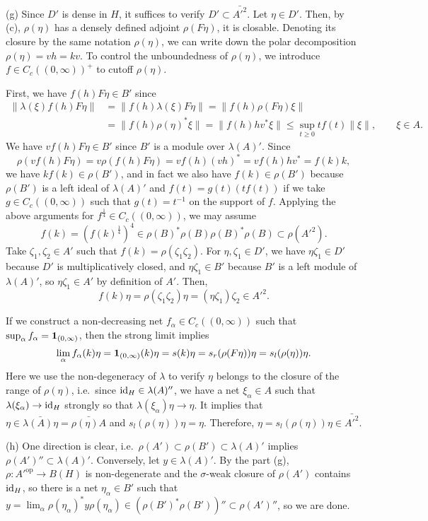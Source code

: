 \documentclass{../../small}
\begin{document}
\begin{pf}
(g)
Since $D'$ is dense in $H$, it suffices to verify $D'\subset\bar{A'^2}$.
Let $\eta\in D'$.
Then, by (c), $\rho(\eta)$ has a densely defined adjoint $\rho(F\eta)$, it is closable.
Denoting its closure by the same notation $\rho(\eta)$, we can write down the polar decomposition $\rho(\eta)=vh=kv$.
To control the unboundedness of $\rho(\eta)$, we introduce $f\in C_c((0,\infty))^+$ to cutoff $\rho(\eta)$.

First, we have $f(h)F\eta\in B'$ since
\begin{align*}
\|\lambda(\xi)f(h)F\eta\|&=\|f(h)\lambda(\xi)F\eta\|=\|f(h)\rho(F\eta)\xi\|\\
&=\|f(h)\rho(\eta)^*\xi\|=\|f(h)hv^*\xi\|\le\sup_{t\ge0}tf(t)\|\xi\|,\qquad\xi\in A.
\end{align*}
We have $vf(h)F\eta\in B'$ since $B'$ is a module over $\lambda(A)'$.
Since
\[\rho(vf(h)F\eta)=v\rho(f(h)F\eta)=vf(h)(vh)^*=vf(h)hv^*=f(k)k,\]
we have $kf(k)\in\rho(B')$, and in fact we also have $f(k)\in\rho(B')$ because $\rho(B')$ is a left ideal of $\lambda(A)'$ and $f(t)=g(t)(tf(t))$ if we take $g\in C_c((0,\infty))$ such that $g(t)=t^{-1}$ on the support of $f$.
Applying the above arguments for $f^{\frac14}\in C_c((0,\infty))$, we may assume
\[f(k)=(f(k)^{\frac14})^4\in\rho(B)^*\rho(B)\rho(B)^*\rho(B)\subset\rho(A'^2).\]
Take $\zeta_1,\zeta_2\in A'$ such that $f(k)=\rho(\zeta_1\zeta_2)$.
For $\eta,\zeta_1\in D'$, we have $\eta\zeta_1\in D'$ because $D'$ is multiplicatively closed, and $\eta\zeta_1\in B'$ because $B'$ is a left module of $\lambda(A)'$, so $\eta\zeta_1\in A'$ by definition of $A'$.
Then,
\[f(k)\eta=\rho(\zeta_1\zeta_2)\eta=(\eta\zeta_1)\zeta_2\in A'^2.\]

If we construct a non-decreasing net $f_\alpha\in C_c((0,\infty))$ such that $\sup_\alpha f_\alpha=\mathbf{1}_{(0,\infty)}$, then the strong limit implies
\[\lim_\alpha f_\alpha(k)\eta=\mathbf{1}_{(0,\infty)}(k)\eta=s(k)\eta=s_r(\rho(F\eta))\eta=s_l(\rho(\eta))\eta.\]
Here we use the non-degeneracy of $\lambda$ to verify $\eta$ belongs to the closure of the range of $\rho(\eta)$, i.e.~since $\operatorname{id}_H\in\lambda(A)''$, we have a net $\xi_\alpha\in A$ such that $\lambda(\xi_\alpha)\to\operatorname{id}_H$ strongly so that $\lambda(\xi_\alpha)\eta\to\eta$.
It implies that $\eta\in\bar{\lambda(A)\eta}=\bar{\rho(\eta)A}$ and $s_l(\rho(\eta))\eta=\eta$.
Therefore, $\eta=s_l(\rho(\eta))\eta\in\bar{A'^2}$.

(h)
One direction is clear, i.e.~$\rho(A')\subset\rho(B')\subset \lambda(A)'$ implies $\rho(A')''\subset\lambda(A)'$.
Conversely, let $y\in\lambda(A)'$.
By the part (g), $\rho:A'^{\operatorname{op}}\to B(H)$ is non-degenerate and the $\sigma$-weak closure of $\rho(A')$ contains $\operatorname{id}_H$, so there is a net $\eta_\alpha\in B'$ such that $y=\lim_\alpha\rho(\eta_\alpha)^*y\rho(\eta_\alpha)\in(\rho(B')^*\rho(B'))''\subset\rho(A')''$, so we are done.
\end{pf}
\end{document}
